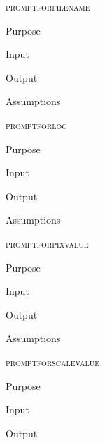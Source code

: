 \documentclass[pdftex, 11pt]{article}
\begin{document}
\begin{description}
\begin{description}
		\end{description}



	\item{\textsc{promptforfilename}}
		\begin{description}
			\item{Purpose}


			\item{Input}


			\item{Output}


			\item{Assumptions}


		\end{description}



	\item{\textsc{promptforloc}}
		\begin{description}
			\item{Purpose}


			\item{Input}


			\item{Output}


			\item{Assumptions}


		\end{description}



	\item{\textsc{promptforpixvalue}}
		\begin{description}
			\item{Purpose}


			\item{Input}


			\item{Output}


			\item{Assumptions}


		\end{description}



	\item{\textsc{promptforscalevalue}}

		\begin{description}
			\item{Purpose}


			\item{Input}


			\item{Output}



\end{description}
\end{description}
\end{document}
